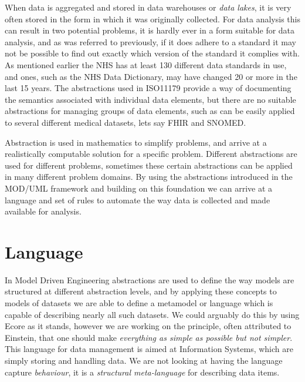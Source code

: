 \documentclass{llncs}
\begin{document}
	When data is aggregated and stored in data warehouses or \emph{data lakes}, it is very often stored in the form in which it was originally collected. For data analysis this can result in two potential problems, it is hardly ever in a form suitable for data analysis, and as was referred to previously, if it does adhere to a standard it may not be possible to find out exactly which version of the standard it complies with. As mentioned earlier the NHS has at least 130 different data standards in use, and ones, such as the NHS Data Dictionary, may have changed 20 or more in the last 15 years. The abstractions used in ISO11179 provide a way of documenting the semantics associated with individual data elements, but there are no suitable abstractions for managing groups of data elements, such as can be easily applied to several different medical datasets, lets say FHIR and SNOMED.
	
	Abstraction is used in mathematics to simplify problems, and arrive at a realistically computable solution for a specific problem. Different abstractions are used for different problems, sometimes these certain abstractions can be applied in many different problem domains. By using the abstractions introduced in the MOD/UML framework and building on this foundation we can arrive at a language and set of rules to automate the way data is collected and made available for analysis.
	
	
	
	\section{Language}
	
	In Model Driven Engineering abstractions are used to define the way models are structured at different abstraction levels, and by applying these concepts to models of datasets we are able to define a metamodel or language which is capable of describing nearly all such datasets. We could arguably do this by using Ecore as it stands, however we are working on the principle, often attributed to Einstein, that one should make \emph{everything as simple as possible but not simpler}. This language for data management is aimed at Information Systems, which are simply storing and handling data. We are not looking at having the language capture \emph{behaviour}, it is a \emph{structural meta-language} for describing data items.
	
\end{document}
